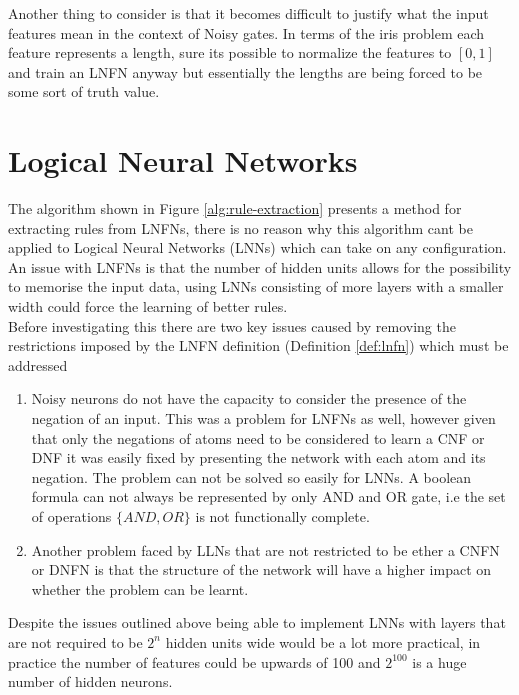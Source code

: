 Another thing to consider is that it becomes difficult to justify what the input features mean in the context of Noisy gates. In terms of the iris problem each feature represents a length, sure its possible to normalize the features to $[0,1]$ and train an LNFN anyway but essentially the lengths are being forced to be some sort of truth value.

\chapter{Logical Neural Networks}
The algorithm shown in Figure \ref{alg:rule-extraction} presents a method for extracting rules from LNFNs, there is no reason why this algorithm cant be applied to Logical Neural Networks (LNNs) \cite{LearningLogicalActivations} which can take on any configuration.\\

An issue with LNFNs is that the number of hidden units allows for the possibility to memorise the input data, using LNNs consisting of more layers with a smaller width could force the learning of better rules.\\

Before investigating this there are two key issues caused by removing the restrictions imposed by the LNFN definition (Definition \ref{def:lnfn}) which must be addressed 

\begin{enumerate}
	\item Noisy neurons do not have the capacity to consider the presence of the negation of an input. This was a problem for LNFNs as well, however given that only the negations of atoms need to be considered to learn a CNF or DNF it was easily fixed by presenting the network with each atom and its negation. The problem can not be solved so easily for LNNs. A boolean formula can not always be represented by only AND and OR gate, i.e the set of operations $\{AND, OR\}$ is not functionally complete. 
	
	\item Another problem faced by LLNs that are not restricted to be ether a CNFN or DNFN is that the structure of the network will have a higher impact on whether the problem can be learnt. 
\end{enumerate}

Despite the issues outlined above being able to implement LNNs with layers that are not required to be $2^n$ hidden units wide would be a lot more practical, in practice the number of features could be upwards of 100 and $2^{100}$ is a huge number of hidden neurons.\\

